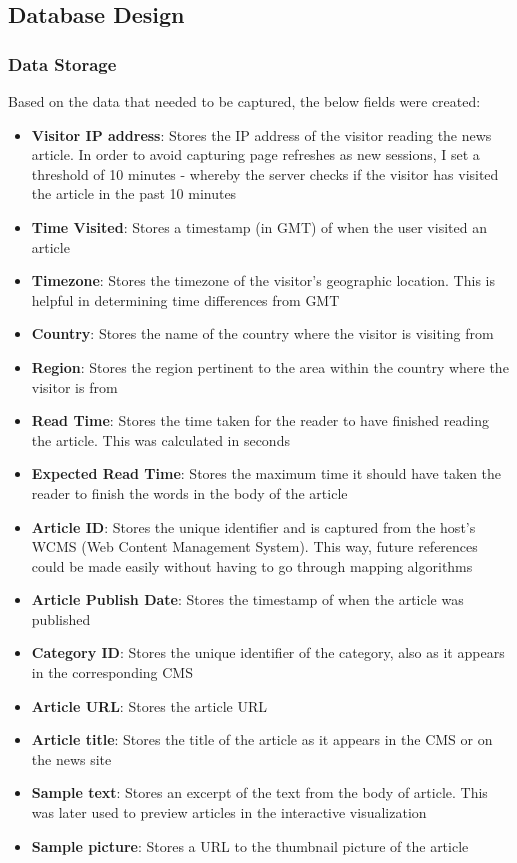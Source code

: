 \documentclass[12pt]{article}
\begin{document}
\vfill

\subsection{Database Design}
\subsubsection{Data Storage}
Based on the data that needed to be captured, the below fields were created:
\begin{itemize}
\item \textbf{Visitor IP address}: Stores the IP address of the visitor reading the news article. In order to avoid capturing page refreshes as new sessions, I set a threshold of 10 minutes - whereby the server checks if the visitor has visited the article in the past 10 minutes
\item \textbf{Time Visited}: Stores a timestamp (in GMT) of when the user visited an article 
\item \textbf{Timezone}: Stores the timezone of the visitor's geographic location. This is helpful in determining time differences from GMT
\item \textbf{Country}: Stores the name of the country where the visitor is visiting from
\item \textbf{Region}: Stores the region pertinent to the area within the country where the visitor is from
\item \textbf{Read Time}: Stores the time taken for the reader to have finished reading the article. This was calculated in seconds
\item \textbf{Expected Read Time}: Stores the maximum time it should have taken the reader to finish the words in the body of the article
\item \textbf{Article ID}: Stores the unique identifier and is captured from the host's WCMS (Web Content Management System). This way, future references could be made easily without having to go through mapping algorithms
\item \textbf{Article Publish Date}: Stores the timestamp of when the article was published
\item \textbf{Category ID}: Stores the unique identifier of the category, also as it appears in the corresponding CMS
\item \textbf{Article URL}: Stores the article URL 
\item \textbf{Article title}: Stores the title of the article as it appears in the CMS or on the news site
\item \textbf{Sample text}: Stores an excerpt of the text from the body of article. This was later used to preview articles in the interactive visualization 
\item \textbf{Sample picture}: Stores a URL to the thumbnail picture of the article

\end{itemize}
\end{document}
